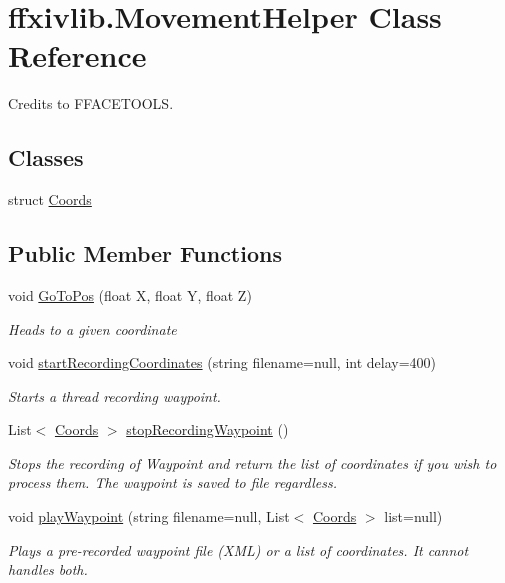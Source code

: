 \hypertarget{classffxivlib_1_1_movement_helper}{\section{ffxivlib.\-Movement\-Helper Class Reference}
\label{classffxivlib_1_1_movement_helper}
}


Credits to F\-F\-A\-C\-E\-T\-O\-O\-L\-S.  


\subsection*{Classes}
\begin{DoxyCompactItemize}
\item 
struct \hyperlink{structffxivlib_1_1_movement_helper_1_1_coords}{Coords}
\end{DoxyCompactItemize}
\subsection*{Public Member Functions}
\begin{DoxyCompactItemize}
\item 
void \hyperlink{classffxivlib_1_1_movement_helper_a7cb94afc3e302ca7a9e4503e43182b2a}{Go\-To\-Pos} (float X, float Y, float Z)
\begin{DoxyCompactList}\small\item\em Heads to a given coordinate \end{DoxyCompactList}\item 
void \hyperlink{classffxivlib_1_1_movement_helper_a2270670d0784b93acc9cc2952118b480}{start\-Recording\-Coordinates} (string filename=null, int delay=400)
\begin{DoxyCompactList}\small\item\em Starts a thread recording waypoint. \end{DoxyCompactList}\item 
List$<$ \hyperlink{structffxivlib_1_1_movement_helper_1_1_coords}{Coords} $>$ \hyperlink{classffxivlib_1_1_movement_helper_a81625fd8f23faf6079d19ddd552b30ba}{stop\-Recording\-Waypoint} ()
\begin{DoxyCompactList}\small\item\em Stops the recording of Waypoint and return the list of coordinates if you wish to process them. The waypoint is saved to file regardless. \end{DoxyCompactList}\item 
void \hyperlink{classffxivlib_1_1_movement_helper_af119b35d20fb48f78a105bb6a5db9b08}{play\-Waypoint} (string filename=null, List$<$ \hyperlink{structffxivlib_1_1_movement_helper_1_1_coords}{Coords} $>$ list=null)
\begin{DoxyCompactList}\small\item\em Plays a pre-\/recorded waypoint file (X\-M\-L) or a list of coordinates. It cannot handles both. \end{DoxyCompactList}\end{DoxyCompactItemize}


